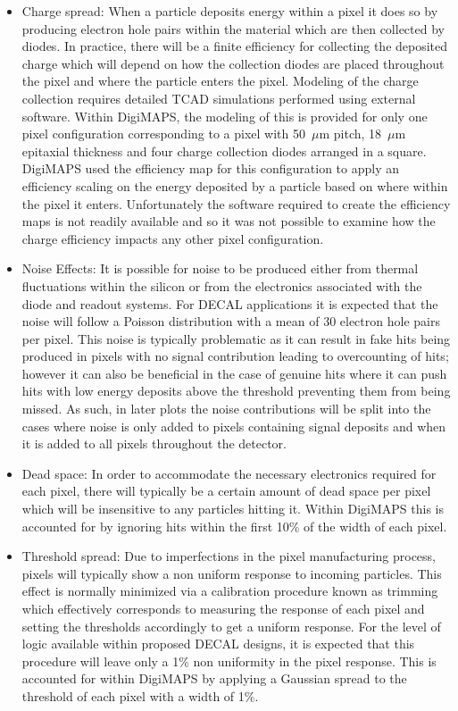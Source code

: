 \begin{itemize}
\item Charge spread: When a particle deposits energy within a pixel it does so by producing electron hole pairs within the material which are then collected by diodes. In practice, there will be a finite efficiency for collecting the deposited charge which will depend on how the collection diodes are placed throughout the pixel and where the particle enters the pixel. Modeling of the charge collection requires detailed TCAD simulations performed using external software. Within DigiMAPS, the modeling of this is provided for only one pixel configuration corresponding to a pixel with 50~$\mu$m pitch, 18~$\mu$m epitaxial thickness and four charge collection diodes arranged in a square. DigiMAPS used the efficiency map for this configuration to apply an efficiency scaling on the energy deposited by a particle based on where within the pixel it enters. Unfortunately the software required to create the efficiency maps is not readily available and so it was not possible to examine how the charge efficiency impacts any other pixel configuration.
  
\item Noise Effects: It is possible for noise to be produced either from thermal fluctuations within the silicon or from the electronics associated with the diode and readout systems. For \ac{DECAL} applications it is expected that the noise will follow a Poisson distribution with a mean of 30 electron hole pairs per pixel. This noise is typically problematic as it can result in fake hits being produced in pixels with no signal contribution leading to overcounting of hits; however it can also be beneficial in the case of genuine hits where it can push hits with low energy deposits above the threshold preventing them from being missed. As such, in later plots the noise contributions will be split into the cases where noise is only added to pixels containing signal deposits and when it is added to all pixels throughout the detector.
  
\item Dead space: In order to accommodate the necessary electronics required for each pixel, there will typically be a certain amount of dead space per pixel which will be insensitive to any particles hitting it. Within DigiMAPS this is accounted for by ignoring hits within the first 10\% of the width of each pixel.
  
\item Threshold spread: Due to imperfections in the pixel manufacturing process, pixels will typically show a non uniform response to incoming particles. This effect is normally minimized via a calibration procedure known as trimming which effectively corresponds to measuring the response of each pixel and setting the thresholds accordingly to get a uniform response. For the level of logic available within proposed \ac{DECAL} designs, it is expected that this procedure will leave only a 1\% non uniformity in the pixel response. This is accounted for within DigiMAPS by applying a Gaussian spread to the threshold of each pixel with a width of 1\%.
  

\end{itemize}
